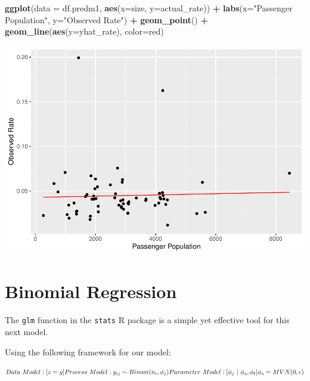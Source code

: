 \documentclass[
  11,
]{book}
\newenvironment{Shaded}{\begin{snugshade}}{\end{snugshade}}
\newcommand{\AttributeTok}[1]{\textcolor[rgb]{0.27,0.27,0.27}{#1}}
\newcommand{\FunctionTok}[1]{\textcolor[rgb]{0.27,0.27,0.27}{\textbf{#1}}}
\newcommand{\NormalTok}[1]{#1}
\newcommand{\SpecialCharTok}[1]{\textcolor[rgb]{0.43,0.43,0.43}{\textbf{#1}}}
\newcommand{\StringTok}[1]{\textcolor[rgb]{0.5,0.5,0.5}{#1}}
\begin{document}
\begin{Shaded}
\begin{Highlighting}[]
\FunctionTok{ggplot}\NormalTok{(}\AttributeTok{data =}\NormalTok{ df.predm1, }\FunctionTok{aes}\NormalTok{(}\AttributeTok{x=}\NormalTok{size, }\AttributeTok{y=}\NormalTok{actual\_rate)) }\SpecialCharTok{+} 
  \FunctionTok{labs}\NormalTok{(}\AttributeTok{x=}\StringTok{"Passenger Population"}\NormalTok{, }\AttributeTok{y=}\StringTok{"Observed Rate"}\NormalTok{) }\SpecialCharTok{+}
  \FunctionTok{geom\_point}\NormalTok{() }\SpecialCharTok{+}
  \FunctionTok{geom\_line}\NormalTok{(}\FunctionTok{aes}\NormalTok{(}\AttributeTok{y=}\NormalTok{yhat\_rate), }\AttributeTok{color=}\StringTok{\textquotesingle{}red\textquotesingle{}}\NormalTok{)}
\end{Highlighting}
\end{Shaded}

\includegraphics{_main_files/figure-latex/predm1_plot-1.pdf}

\hypertarget{binomial-regression}{%
\section*{Binomial Regression}\label{binomial-regression}}


The \texttt{glm} function in the \texttt{stats} R package is a simple yet effective tool for this next model.

Using the following framework for our model:

\begin{equation}
{Data \ Model}: [z=y]
\newline
{Process \ Model}: y_{ij} \sim Binom(n_i,\phi_j)
\newline
{Parameter \ Model}: [\phi_j \ | \ \phi_s,\phi_t]
\newline
\phi_s = MVN(0,\epsilon)
\end{equation}
\end{document}
